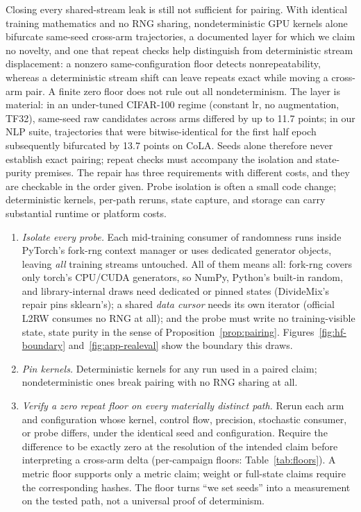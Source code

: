 Closing every shared-stream leak is still not sufficient for pairing. With
identical training mathematics and no RNG sharing, nondeterministic GPU
kernels alone bifurcate same-seed cross-arm trajectories, a documented
layer \citep{zhuang2021randomness} for which we claim no novelty, and one
that repeat checks help distinguish from deterministic stream displacement:
a nonzero same-configuration floor detects nonrepeatability, whereas a
deterministic stream shift can leave repeats exact while moving a cross-arm
pair. A finite zero floor does not rule out all nondeterminism. The layer
is material: in an under-tuned CIFAR-100 regime
(constant lr, no augmentation, TF32), same-seed raw candidates across arms
differed by up to 11.7 points; in our NLP suite, trajectories that were
bitwise-identical for the first half epoch subsequently bifurcated by 13.7
points on CoLA. Seeds alone therefore never
establish exact pairing; repeat checks must accompany the isolation and
state-purity premises.
The repair has three requirements with different costs, and they are
checkable in the order given. Probe isolation is often a small code change;
deterministic kernels, per-path reruns, state capture, and storage can carry
substantial runtime or platform costs.

\begin{enumerate}\itemsep1pt\parskip0pt
\item \emph{Isolate every probe.} Each mid-training consumer of randomness runs
inside PyTorch's fork-rng context manager \citep{pytorch_forkrng} or uses
dedicated generator objects, leaving \emph{all} training streams untouched.
All of them means all: fork-rng covers only torch's CPU/CUDA generators, so
NumPy, Python's built-in random, and library-internal draws need dedicated or
pinned states (DivideMix's repair pins sklearn's); a shared \emph{data cursor}
needs its own iterator (official L2RW consumes no RNG at all); and the probe
must write no training-visible state, state purity in the sense of
Proposition~\ref{prop:pairing}. Figures~\ref{fig:hf-boundary}
and~\ref{fig:app-realeval} show the boundary this draws.
\item \emph{Pin kernels.} Deterministic kernels for any run used in a paired
claim; nondeterministic ones break pairing with no RNG sharing at all.
\item \emph{Verify a zero repeat floor on every materially distinct path.}
Rerun each arm and configuration whose kernel, control flow, precision,
stochastic consumer, or probe differs, under the identical seed and
configuration. Require the difference to be exactly zero at the resolution of
the intended claim before interpreting a cross-arm delta (per-campaign floors:
Table~\ref{tab:floors}). A metric floor supports only a metric claim; weight
or full-state claims require the corresponding hashes. The floor turns ``we
set seeds'' into a measurement on the tested path, not a universal proof of
determinism.
\end{enumerate}

